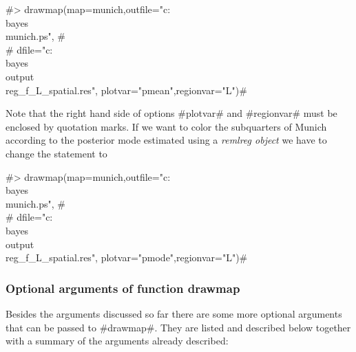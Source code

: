  #> drawmap(map=munich,outfile="c:\\bayes\\munich.ps", #\\
 #  dfile="c:\\bayes\\output\\reg_f_L_spatial.res", plotvar="pmean",regionvar="L")#

Note that the right hand side of options #plotvar# and #regionvar#
must be enclosed by quotation marks. If we want to color the
subquarters of Munich according to the posterior mode estimated
using a {\em remlreg object} we have to change the statement to

 #> drawmap(map=munich,outfile="c:\\bayes\\munich.ps", #\\
 #  dfile="c:\\bayes\\output\\reg_f_L_spatial.res", plotvar="pmode",regionvar="L")#

\subsubsection*{Optional arguments of function drawmap}

Besides the arguments discussed so far there are some more
optional arguments that can be passed to #drawmap#. They are
listed and described below together with a summary of the
arguments already described:



